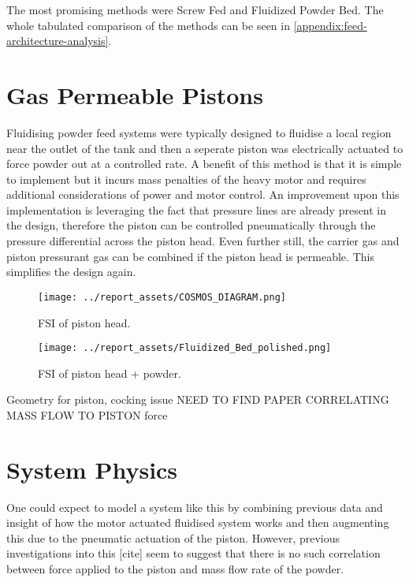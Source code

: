 The most promising methods were Screw Fed and Fluidized Powder Bed. The whole tabulated comparison of the methods can be seen in \autoref{appendix:feed-architecture-analysis}.



\section{Gas Permeable Pistons}
Fluidising powder feed systems were typically designed to fluidise a local region near the outlet of the tank and then a seperate piston was electrically actuated to force powder out at a controlled rate. A benefit of this method is that it is simple to implement but it incurs mass penalties of the heavy motor and requires additional considerations of power and motor control. An improvement upon this implementation is leveraging the fact that pressure lines are already present in the design, therefore the piston can be controlled pneumatically through the pressure differential across the piston head. Even further still, the carrier gas and piston pressurant gas can be combined if the piston head is permeable. This simplifies the design again.

\begin{figure}[htbp]
    \centering

    \begin{minipage}{0.45\textwidth}
        \centering
        \texttt{[image: ../report\_assets/COSMOS\_DIAGRAM.png]}
        \caption{FSI of piston head.}
        \label{fig:fluent-fsi-piston-head}
    \end{minipage}
    \hfill
    \begin{minipage}{0.45\textwidth}
        \centering
        \texttt{[image: ../report\_assets/Fluidized\_Bed\_polished.png]}
        \caption{FSI of piston head + powder.}
        \label{fig:fluent-fsi-piston-head-powder}
    \end{minipage}

\end{figure}

Geometry for piston, cocking issue
NEED TO FIND PAPER CORRELATING MASS FLOW TO PISTON force
\newpage
\section{System Physics}
One could expect to model a system like this by combining previous data and insight of how the motor actuated fluidised system works and then augmenting this due to the pneumatic actuation of the piston. However, previous investigations into this [cite] seem to suggest that there is no such correlation between force applied to the piston and mass flow rate of the powder. 

